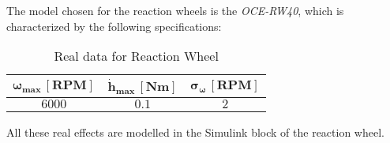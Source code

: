 The model chosen for the reaction wheels is the \textit{OCE-RW40}, which is characterized by the following specifications:

\begin{table}[H]

    \centering
    \begin{tabular}{|c|c|c|}
    \hline
    $\bm{\omega_{max} \, [RPM]}$ & $\bm{\dot{h}_{max} \, [Nm]}$ & $\bm{\sigma_{\omega} \, [RPM]}$ \\
    \hline
    $6000$ & $0.1$ & $2$  \\
    \hline
    \end{tabular}
    
    \caption{Real data for Reaction Wheel}
    \label{table:RW}
    
\end{table}

All these real effects are modelled in the Simulink block of the reaction wheel. 
	
